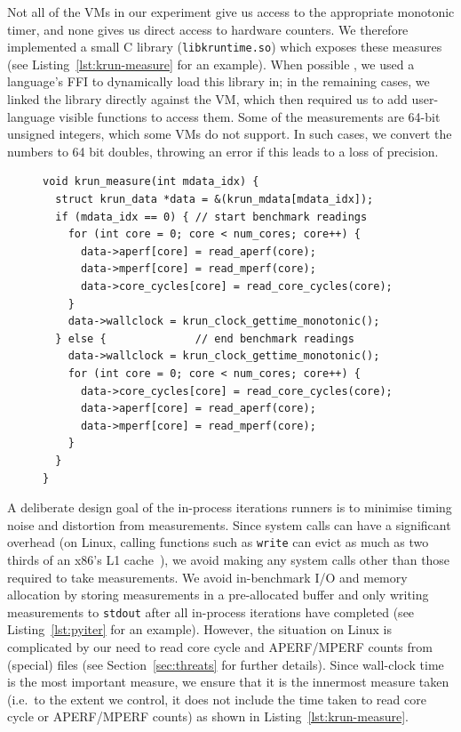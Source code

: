 \documentclass[preprint,numbers,10pt]{sigplanconf}
\begin{document}
Not all of the VMs in our experiment give us access to the appropriate monotonic
timer, and none gives us direct access to hardware counters. We therefore
implemented a small C library (\texttt{libkruntime.so}) which exposes these
measures (see Listing~\ref{lst:krun-measure} for an example). When possible
, we used a language's FFI to dynamically load this library
in; in the remaining cases, we linked the library directly against the VM, which
then required us to add user-language visible functions to access them. Some
 of the measurements are 64-bit unsigned integers, which some
 VMs do not support. In such cases, we convert the numbers to 64
bit doubles, throwing an error if this leads to a loss of precision.

\begin{figure}[t]
\begin{lstlisting}[label=lst:krun-measure, xleftmargin=0cm,
        caption={%
\texttt{krun\_measure}: Measurements can't be taken atomically, so later
measurements include the time taken to read earlier measurements. Since
wall-clock time is the most important measure, it is innermost; since
the APERF / MPERF ratio is a sanity check, it is outermost. Note that
the APERF / MPERF ratios must be read in the same order both before
and after a benchmark.}]
void krun_measure(int mdata_idx) {
  struct krun_data *data = &(krun_mdata[mdata_idx]);
  if (mdata_idx == 0) { // start benchmark readings
    for (int core = 0; core < num_cores; core++) {
      data->aperf[core] = read_aperf(core);
      data->mperf[core] = read_mperf(core);
      data->core_cycles[core] = read_core_cycles(core);
    }
    data->wallclock = krun_clock_gettime_monotonic();
  } else {              // end benchmark readings
    data->wallclock = krun_clock_gettime_monotonic();
    for (int core = 0; core < num_cores; core++) {
      data->core_cycles[core] = read_core_cycles(core);
      data->aperf[core] = read_aperf(core);
      data->mperf[core] = read_mperf(core);
    }
  }
}
\end{lstlisting}
\vspace{-.8cm}
\end{figure}

A deliberate design goal of the in-process iterations runners is to minimise
timing noise and distortion from measurements. Since system calls can have a
significant overhead (on Linux, calling functions such as \texttt{write} can
evict as much as two thirds of an x86's L1 cache~\cite{soares10flexsc}), we
avoid making any system calls other than those required to take measurements. We
avoid in-benchmark I/O and memory allocation by storing measurements in a
pre-allocated buffer and only writing measurements to \texttt{stdout} after all
in-process iterations have completed (see Listing~\ref{lst:pyiter} for an
example). However, the situation on Linux is complicated by our need to read
core cycle and APERF/MPERF counts from (special) files (see
Section~\ref{sec:threats} for further details). Since wall-clock time
is the most important measure, we ensure that it is the innermost measure taken
(i.e.~to the extent we control, it does not include the time taken to read
core cycle or APERF/MPERF counts) as shown in Listing~\ref{lst:krun-measure}.
\end{document}
